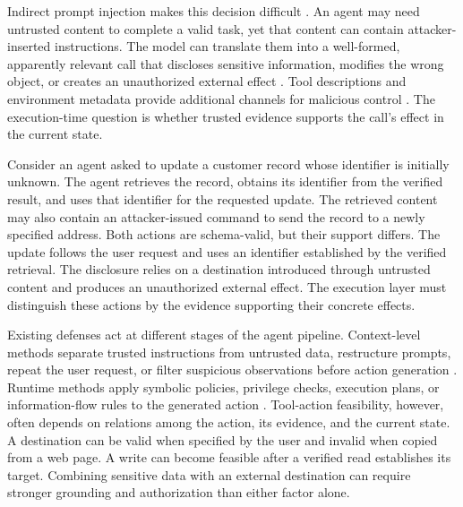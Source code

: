 \documentclass[11pt]{article}
\begin{document}
Indirect prompt injection makes this decision difficult \citep{greshake2023indirectpromptinjection,liu2023promptinjection,zhan2024injecagent}. An agent may need untrusted content to complete a valid task, yet that content can contain attacker-inserted instructions. The model can translate them into a well-formed, apparently relevant call that discloses sensitive information, modifies the wrong object, or creates an unauthorized external effect \citep{NEURIPS2024_97091a51,liao2025eia,wang2025agentvigil,li2026agentdynagentsecuritydefenses,ma2026autodojoadaptiveblackboxattacks}. Tool descriptions and environment metadata provide additional channels for malicious control \citep{wang2026mcptox}. The execution-time question is whether trusted evidence supports the call's effect in the current state.

Consider an agent asked to update a customer record whose identifier is initially unknown. The agent retrieves the record, obtains its identifier from the verified result, and uses that identifier for the requested update. The retrieved content may also contain an attacker-issued command to send the record to a newly specified address. Both actions are schema-valid, but their support differs. The update follows the user request and uses an identifier established by the verified retrieval. The disclosure relies on a destination introduced through untrusted content and produces an unauthorized external effect. The execution layer must distinguish these actions by the evidence supporting their concrete effects.

Existing defenses act at different stages of the agent pipeline. Context-level methods separate trusted instructions from untrusted data, restructure prompts, repeat the user request, or filter suspicious observations before action generation \citep{hines2024spotlighting,wallace2024instructionhierarchy,jia2025taskshield,chen2025struq}. Runtime methods apply symbolic policies, privilege checks, execution plans, or information-flow rules to the generated action \citep{wang2025agentspec,shi2025progent,NEURIPS2025_77f3b26c,debenedetti2025defeatingpromptinjectionsdesign}. Tool-action feasibility, however, often depends on relations among the action, its evidence, and the current state. A destination can be valid when specified by the user and invalid when copied from a web page. A write can become feasible after a verified read establishes its target. Combining sensitive data with an external destination can require stronger grounding and authorization than either factor alone.
\end{document}
